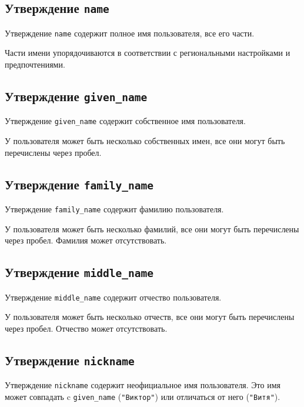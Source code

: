 \label{CLAIMS.User}

\subsection{Утверждение \lstinline{name}}\label{CLAIMS.Name}

Утверждение \lstinline{name} содержит полное имя пользователя, все его части.

Части имени упорядочиваются в соответствии с региональными настройками и 
предпочтениями.

\subsection{Утверждение \lstinline{given_name}}\label{CLAIMS.GivenName}

Утверждение \lstinline{given_name} содержит собственное имя пользователя.

У пользователя может быть несколько собственных имен, все они могут быть 
перечислены через пробел.

\subsection{Утверждение \lstinline{family_name}}\label{CLAIMS.FamilyName}

Утверждение \lstinline{family_name} содержит фамилию пользователя.

У пользователя может быть несколько фамилий, все они могут быть 
перечислены через пробел. Фамилия может отсутствовать.

\subsection{Утверждение \lstinline{middle_name}}\label{CLAIMS.MiddleName}

Утверждение \lstinline{middle_name} содержит отчество пользователя.

У пользователя может быть несколько отчеств, все они могут быть 
перечислены через пробел. Отчество может отсутствовать.

\subsection{Утверждение \lstinline{nickname}}\label{CLAIMS.Nickname}

Утверждение \lstinline{nickname} содержит неофициальное имя пользователя.
Это имя может совпадать c \lstinline{given_name} (\texttt{"Виктор"}) 
или отличаться от него (\texttt{"Витя"}).

